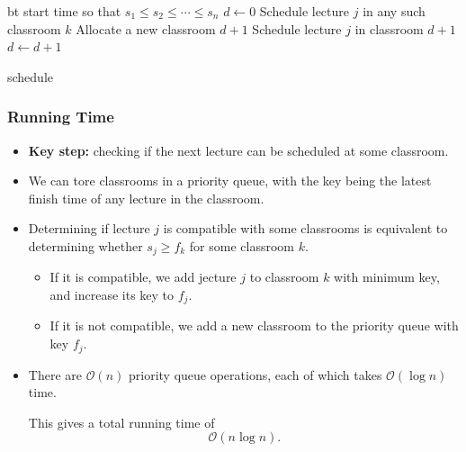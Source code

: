 \begin{algorithm}
    \begin{algorithmic}
            \State {} bt start time so that $s_1 \le s_2 \le \cdots \le s_n$
            \State $d \gets 0$
                    \State Schedule lecture $j$ in any such classroom $k$
                \Else
                    \State Allocate a new classroom $d + 1$
                    \State Schedule lecture $j$ in classroom $d + 1$
                    \State $d \gets d + 1$
                \EndIf
            \EndFor

            \State \Return schedule
        \EndFunction
    \end{algorithmic}
\end{algorithm}

\subsubsection{Running Time}

\begin{itemize}
    \item \textbf{Key step:} checking if the next lecture can be scheduled at some classroom.

    \item We can tore classrooms in a priority queue, with the key being the latest finish time of any lecture in the classroom.

    \item Determining if lecture $j$ is compatible with some classrooms is equivalent to determining whether $s_j \ge f_k$ for some classroom $k$.

    \begin{itemize}
        \item If it is compatible, we add jecture $j$ to classroom $k$ with minimum key, and increase its key to $f_j$.
        \item If it is not compatible, we add a new classroom to the priority queue with key $f_j$.
    \end{itemize}

    \item There are $\mathcal{O}(n)$ priority queue operations, each of which takes $\mathcal{O}(\log n)$ time.

    This gives a total running time of \[
        \mathcal{O}(n \log n).
    \]
\end{itemize}

